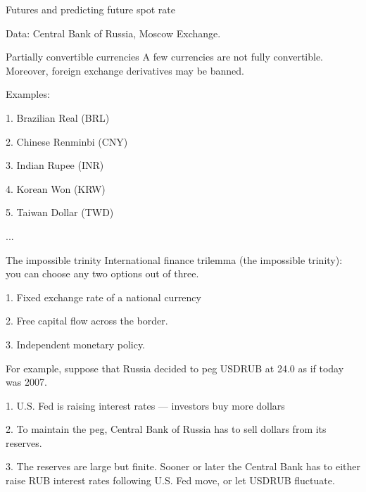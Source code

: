 \documentclass{beamer}
\begin{document}
\begin{frame}{Futures and predicting future spot rate}
\center
{}

\scriptsize Data: Central Bank of Russia, Moscow Exchange.
\end{frame}



\begin{frame}{Partially convertible currencies}
\justify
A few currencies are not fully convertible. Moreover, foreign exchange derivatives may be banned.

\justify
Examples:

1. Brazilian Real (BRL)

2. Chinese Renminbi (CNY)

3. Indian Rupee (INR)

4. Korean Won (KRW)

5. Taiwan Dollar (TWD)

...

\end{frame}



\begin{frame}{The impossible trinity}
\justify
International finance trilemma (the impossible trinity): you can choose any two options out of three. 

1. Fixed exchange rate of a national currency

2. Free capital flow across the border.

3. Independent monetary policy.

\justify
For example, suppose that Russia decided to peg USDRUB at 24.0 as if today was 2007.

1. U.S. Fed is raising interest rates --- investors buy more dollars

2. To maintain the peg, Central Bank of Russia has to sell dollars from its reserves.

3. The reserves are large but finite. Sooner or later the Central Bank has to either raise RUB interest rates following U.S. Fed move, or let USDRUB fluctuate.

\end{frame}
\end{document}
